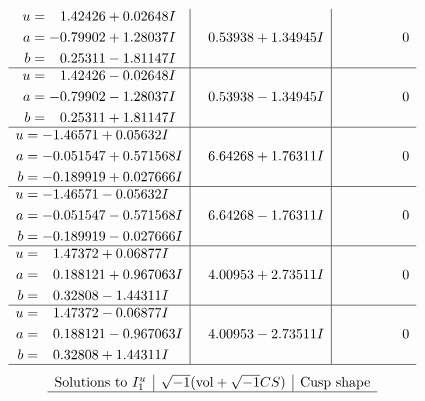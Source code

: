 \documentclass[1p]{elsarticle_modified}
\theoremstyle{definition}
\newcommand{\I}{\sqrt{-1}}
\begin{document}
$$\begin{array}{c|c|c}
\begin{aligned}
u &= \phantom{-}1.42426 + 0.02648 I \\
a &= -0.79902 + 1.28037 I \\
b &= \phantom{-}0.25311 - 1.81147 I\end{aligned}
 & \phantom{-}0.53938 + 1.34945 I & \phantom{-0.000000 } 0 \\ \hline\begin{aligned}
u &= \phantom{-}1.42426 - 0.02648 I \\
a &= -0.79902 - 1.28037 I \\
b &= \phantom{-}0.25311 + 1.81147 I\end{aligned}
 & \phantom{-}0.53938 - 1.34945 I & \phantom{-0.000000 } 0 \\ \hline\begin{aligned}
u &= -1.46571 + 0.05632 I \\
a &= -0.051547 + 0.571568 I \\
b &= -0.189919 + 0.027666 I\end{aligned}
 & \phantom{-}6.64268 + 1.76311 I & \phantom{-0.000000 } 0 \\ \hline\begin{aligned}
u &= -1.46571 - 0.05632 I \\
a &= -0.051547 - 0.571568 I \\
b &= -0.189919 - 0.027666 I\end{aligned}
 & \phantom{-}6.64268 - 1.76311 I & \phantom{-0.000000 } 0 \\ \hline\begin{aligned}
u &= \phantom{-}1.47372 + 0.06877 I \\
a &= \phantom{-}0.188121 + 0.967063 I \\
b &= \phantom{-}0.32808 - 1.44311 I\end{aligned}
 & \phantom{-}4.00953 + 2.73511 I & \phantom{-0.000000 } 0 \\ \hline\begin{aligned}
u &= \phantom{-}1.47372 - 0.06877 I \\
a &= \phantom{-}0.188121 - 0.967063 I \\
b &= \phantom{-}0.32808 + 1.44311 I\end{aligned}
 & \phantom{-}4.00953 - 2.73511 I & \phantom{-0.000000 } 0\\
 \hline 
 \end{array}$$\newpage$$\begin{array}{c|c|c}  
\text{Solutions to }I^u_{1}& \I (\text{vol} + \sqrt{-1}CS) & \text{Cusp shape}\\
 \hline 

\end{array}$$
\end{document}
